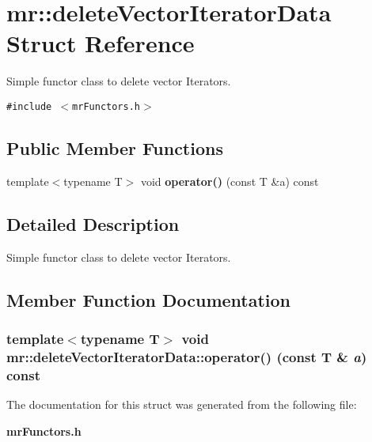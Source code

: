 \section{mr::delete\-Vector\-Iterator\-Data Struct Reference}
\label{structmr_1_1deleteVectorIteratorData}
Simple functor class to delete vector Iterators.  


{\tt \#include $<$mr\-Functors.h$>$}

\subsection*{Public Member Functions}
\begin{CompactItemize}
\item 
template$<$typename T$>$ void {\bf operator()} (const T \&a) const 
\end{CompactItemize}


\subsection{Detailed Description}
Simple functor class to delete vector Iterators. 



\subsection{Member Function Documentation}
\subsubsection{\setlength{\rightskip}{0pt plus 5cm}template$<$typename T$>$ void mr::delete\-Vector\-Iterator\-Data::operator() (const T \& {\em a}) const\hspace{0.3cm}{\tt  [inline]}}\label{structmr_1_1deleteVectorIteratorData_a0}




The documentation for this struct was generated from the following file:\begin{CompactItemize}
\item 
{\bf mr\-Functors.h}\end{CompactItemize}
